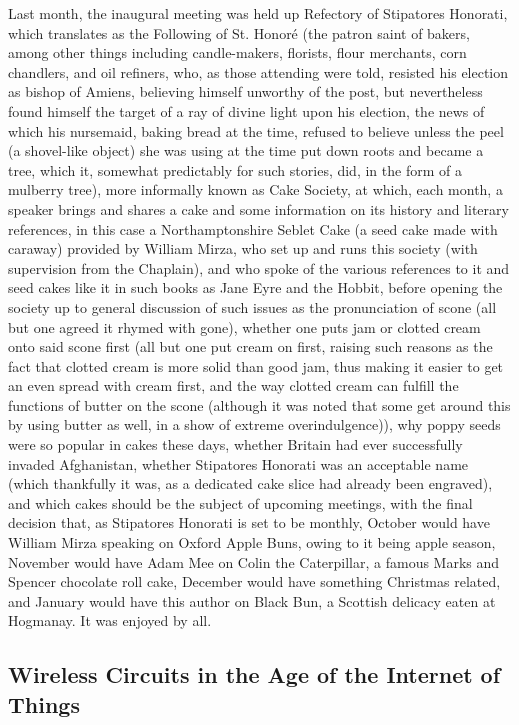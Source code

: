		Last month, the inaugural meeting was held up Refectory of Stipatores Honorati, which translates as the Following of St. Honoré (the patron saint of bakers, among other things including candle-makers, florists, flour merchants, corn chandlers, and oil refiners, who, as those attending were told, resisted his election as bishop of Amiens, believing himself unworthy of the post, but nevertheless found himself the target of a ray of divine light upon his election, the news of which his nursemaid, baking bread at the time, refused to believe unless the peel (a shovel-like object) she was using at the time put down roots and became a tree, which it, somewhat predictably for such stories, did, in the form of a mulberry tree), more informally known as Cake Society, at which, each month, a speaker brings and shares a cake and some information on its history and literary references, in this case a Northamptonshire Seblet Cake (a seed cake made with caraway) provided by William Mirza, who set up and runs this society (with supervision from the Chaplain), and who spoke of the various references to it and seed cakes like it in such books as Jane Eyre and the Hobbit, before opening the society up to general discussion of such issues as the pronunciation of scone (all but one agreed it rhymed with gone), whether one puts jam or clotted cream onto said scone first (all but one put cream on first, raising such reasons as the fact that clotted cream is more solid than good jam, thus making it easier to get an even spread with cream first, and the way clotted cream can fulfill the functions of butter on the scone (although it was noted that some get around this by using butter as well, in a show of extreme overindulgence)), why poppy seeds were so popular in cakes these days, whether Britain had ever successfully invaded Afghanistan, whether Stipatores Honorati was an acceptable name (which thankfully it was, as a dedicated cake slice had already been engraved), and which cakes should be the subject of upcoming meetings, with the final decision that, as Stipatores Honorati is set to be monthly, October would have William Mirza speaking on Oxford Apple Buns, owing to it being apple season, November would have Adam Mee on Colin the Caterpillar, a famous Marks and Spencer chocolate roll cake, December would have something Christmas related, and January would have this author on Black Bun, a Scottish delicacy eaten at Hogmanay. It was enjoyed by all.



	\subsection{Wireless Circuits in the Age of the Internet of Things}


